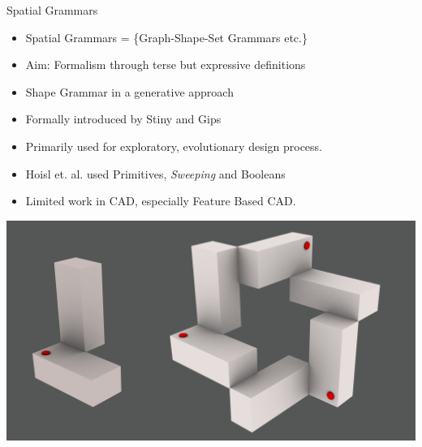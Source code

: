 \begin{frame}{Spatial Grammars}

\begin{itemize}[noitemsep,label=\textbullet,topsep=2pt,parsep=2pt,partopsep=2pt]
\item Spatial Grammars = \{Graph-Shape-Set Grammars etc.\} 
\item Aim: Formalism through terse but expressive definitions
\item Shape Grammar in a generative approach
\item Formally introduced by Stiny and Gips \cite{Stiny1971} 
\item Primarily used for exploratory, evolutionary design process. 
\item Hoisl et. al.\cite{Hoisl2009} used Primitives, {\em Sweeping} and Booleans
\item Limited work in CAD, especially Feature Based CAD.

\end{itemize}

\begin{center}\includegraphics[width=0.6\linewidth]{../Common/images/SpatialGrammar.jpg}\end{center}


\end{frame}

